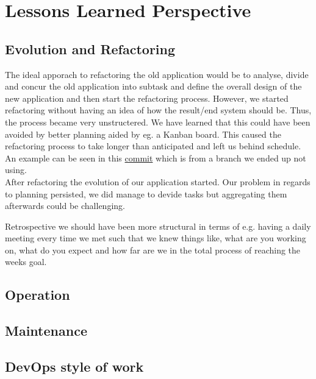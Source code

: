 \section{Lessons Learned Perspective}

\subsection{Evolution and Refactoring}
The ideal apporach to refactoring the old application would be to analyse, divide and concur the old application into 
subtask and define the overall design of the new application and then start the refactoring process. However, we started
refactoring without having an idea of how the result/end system should be. Thus, the process became very unstructered. 
We have learned that this could have been avoided by better planning aided by eg. a Kanban board. This caused the 
refactoring process to take longer than anticipated and left us behind schedule. An example can be seen in this
\href{https://github.com/organizationGB/DevOps/commit/7bbccc97d6d69e90724b00e93e92334210490085}{commit} which is from a 
branch we ended up not using. \\

After refactoring the evolution of our application started. Our problem in regards to planning persisted, we did manage
to devide tasks but aggregating them afterwards could be challenging.  



Retrospective we should have been more structural in terms of e.g. having a daily meeting every time we met such 
that we knew things like, what are you working on, what do you expect and how far are we in the total process of 
reaching the weeks goal.


\subsection{Operation}

\subsection{Maintenance}

\subsection{DevOps style of work}